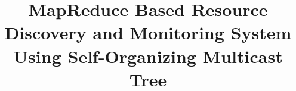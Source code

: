 \documentclass{acm_proc_article-sp}
\begin{document}
\title{MapReduce Based Resource Discovery and Monitoring System Using Self-Organizing Multicast Tree}
%
%
%
%
%
\end{document}
